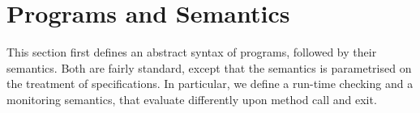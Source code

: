 \section{Programs and Semantics}\label{SecProgram}

This section first defines an abstract syntax of programs, followed by
their semantics. Both are fairly standard, except that the semantics
is parametrised on the treatment of specifications. In particular, we
define a run-time checking and a monitoring semantics, that evaluate
differently upon method call and exit.


